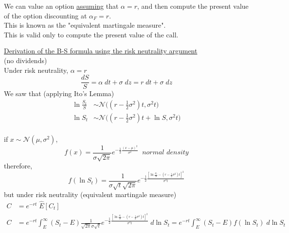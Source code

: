 \documentclass[
14pt,notheorems,hyperref={pdfauthor=whatever}
]{beamer}
\begin{document}
\begin{frame}
We can value an option \underline{assuming} that $\alpha=r$, and then compute the present value of the option discounting at $\alpha_F=r$.\\
\hfill\break
This is known as the "equivalent martingale measure".\\
\hfill\break
This is valid only to compute the present value of the call.\\
\end{frame}

\begin{frame}
\underline{Derivation of the B-S formula using the risk neutrality argument}\\
(no dividends)\\
\hfill\break
Under risk neutrality, $\alpha=r$\\
\[ \frac{dS}{S} = \alpha\;dt + \sigma\;dz = r\;dt+\sigma\;dz\]
We saw that (applying Ito's Lemma)\\
\begin{align*}
    \ln{\frac{S_t}{S}} &\sim \mathcal{N}\bigg((r-\frac{1}{2}\sigma^2)t, \sigma^2 t \bigg)\\
    \ln{S_t} &\sim \mathcal{N}\bigg((r-\frac{1}{2}\sigma^2)t+\ln{S}, \sigma^2 t \bigg)\\
\end{align*}
\end{frame}

\begin{frame}
if $x \sim \mathcal{N}(\mu, \sigma^2)$,
\[f(x) = \frac{1}{\sigma \sqrt{2\pi}} e^{-\frac{1}{2}\frac{(x-\mu)^2}{\sigma^2}} \;\; \textit{normal density}\]
therefore,
\[f(\ln{S_t}) = \frac{1}{\sigma \sqrt{t} \sqrt{2\pi}} e^{-\frac{1}{2}\frac{[\ln{\frac{S_t}{S}}-(r-\frac{1}{2}\sigma^2)t]^2}{\sigma^2 t}}\]
but under risk neutrality (equivalent martingale measure)\\
\begin{align*}
    C &= e^{-rt}\;\hat{E}[C_t]\\
    C &= e^{-rt} \int_E^\infty (S_t-E) \frac{1}{\sqrt{2\pi} \sigma \sqrt{t}} e^{-\frac{1}{2}\frac{[\ln{\frac{S_t}{S}}-(r-\frac{1}{2}\sigma^2)t]^2}{\sigma^2 t}} \;d\ln{S_t} = e^{-rt} \int_E^\infty (S_t-E) f(\ln{S_t})\;d\ln{S_t}\\
\end{align*}
\end{frame}
\end{document}
